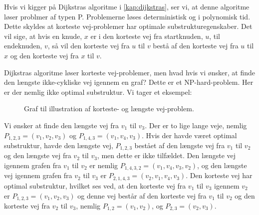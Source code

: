Hvis vi kigger på Dijkstras algoritme i \autoref{kap:dijkstras}, ser vi, at denne algoritme løser problmer af typen P. Problemerne løses deterministisk og i polynomisk tid. Dette skyldes at korteste vej-problemer har optimale substrukturegenskaber. Det vil sige, at hvis en knude, $x$ er i den korteste vej fra startknuden, $u$, til endeknuden, $v$, så vil den korteste vej fra $u$ til $v$ bestå af den korteste vej fra $u$ til $x$ og den korteste vej fra $x$ til $v$. 

Dijkstras algoritme løser korteste vej-problemer, men hvad hvis vi ønsker, at finde den længste ikke-cykliske vej igennem en graf? Dette er et NP-hard-problem. Her er der nemlig ikke optimal substruktur. Vi tager et eksempel:

\begin{exmp} \label{exmp.np}
\begin{figure}[H]
\centering
	\caption{Graf til illustration af korteste- og længste vej-problem.}
	\label{fig.multi}
\end{figure}

Vi ønsker at finde den længste vej fra $v_1$ til $v_3$. Der er to lige lange veje, nemlig $P_{1,2,3}=(v_{1},v_{2},v_{3})$ og $P_{1,4,3}=(v_{1},v_{4},v_{3})$. Hvis der havde været optimal substruktur, havde den længste vej, $P_{1,2,3}$ bestået af den længste vej fra $v_{1}$ til $v_{2}$ og den længste vej fra $v_{2}$ til $v_{3}$, men dette er ikke tilfældet. Den længste vej igennem grafen fra $v_{1}$ til $v_{2}$ er nemlig $P_{1,4,3,2}=(v_{1},v_{4},v_{3},v_{2})$, og den længste vej igennem grafen fra $v_{2}$ til $v_{3}$ er $P_{2,1,4,3}=(v_{2},v_{1},v_{4},v_{3})$. 
Den korteste vej har optimal substruktur, hvilket ses ved, at den korteste vej fra $v_{1}$ til $v_{3}$ igennem $v_{2}$ er $P_{1,2,3}=(v_{1},v_{2},v_{3})$ og denne vej består af den korteste vej fra $v_{1}$ til $v_{2}$ og den korteste vej fra $v_{2}$ til $v_{3}$, nemlig $P_{1,2}=(v_{1},v_{2})$, og $P_{2,3}=(v_{2},v_{3})$. 
\end{exmp}





